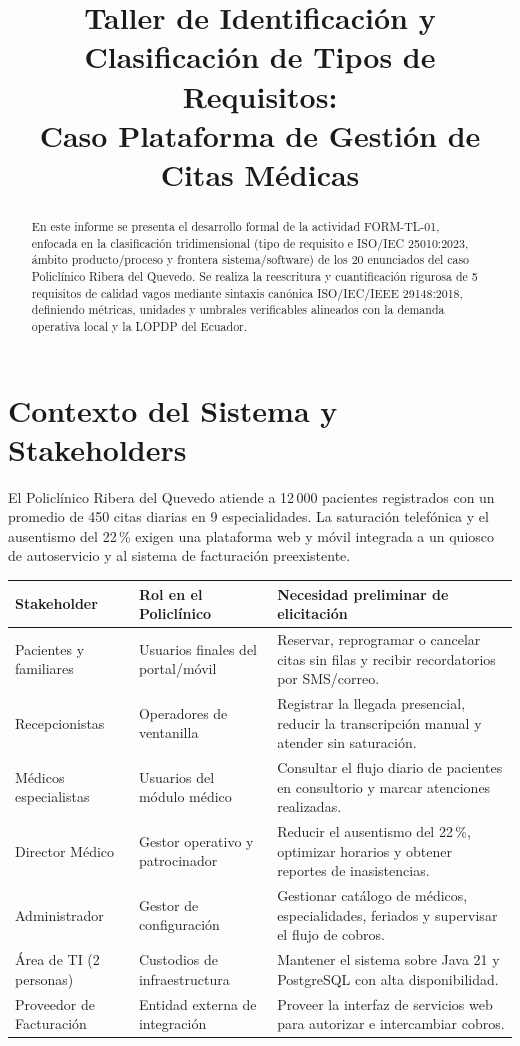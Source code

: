 \documentclass[conference]{IEEEtran}
\title{Taller de Identificaci\'on y Clasificaci\'on de Tipos de Requisitos:\\Caso Plataforma de Gesti\'on de Citas M\'edicas}
\author{
  \IEEEauthorblockN{Jos\'e Ignacio Gilces Carranza}
  \IEEEauthorblockA{Universidad T\'ecnica Estatal de Quevedo (UTEQ) --- Facultad de Ciencias de la Computaci\'on\\
  Ingenier\'ia de Software $\cdot$ Ingenier\'ia de Requisitos (ISR-401) $\cdot$ Actividad Formativa FORM-TL-01}
}
\begin{document}
\onecolumn
\maketitle

\begin{abstract}
En este informe se presenta el desarrollo formal de la actividad FORM-TL-01, enfocada en la clasificaci\'on tridimensional (tipo de requisito e ISO/IEC 25010:2023, \'ambito producto/proceso y frontera sistema/software) de los 20 enunciados del caso Policl\'inico Ribera del Quevedo. Se realiza la reescritura y cuantificaci\'on rigurosa de 5 requisitos de calidad vagos mediante sintaxis can\'onica ISO/IEC/IEEE 29148:2018, definiendo m\'etricas, unidades y umbrales verificables alineados con la demanda operativa local y la LOPDP del Ecuador.
\end{abstract}

\section{Contexto del Sistema y Stakeholders}
El Policl\'inico Ribera del Quevedo atiende a 12\,000 pacientes registrados con un promedio de 450 citas diarias en 9 especialidades. La saturaci\'on telef\'onica y el ausentismo del 22\,\% exigen una plataforma web y m\'ovil integrada a un quiosco de autoservicio y al sistema de facturaci\'on preexistente.

\begin{center}
\footnotesize
\begin{tabularx}{\textwidth}{@{}p{3.2cm}p{3.8cm}>{\raggedright\arraybackslash}X@{}}
\toprule
\textbf{Stakeholder} & \textbf{Rol en el Policl\'inico} & \textbf{Necesidad preliminar de elicitaci\'on}\\
\midrule
Pacientes y familiares & Usuarios finales del portal/m\'ovil & Reservar, reprogramar o cancelar citas sin filas y recibir recordatorios por SMS/correo.\\
Recepcionistas & Operadores de ventanilla & Registrar la llegada presencial, reducir la transcripci\'on manual y atender sin saturaci\'on.\\
M\'edicos especialistas & Usuarios del m\'odulo m\'edico & Consultar el flujo diario de pacientes en consultorio y marcar atenciones realizadas.\\
Director M\'edico & Gestor operativo y patrocinador & Reducir el ausentismo del 22\,\%, optimizar horarios y obtener reportes de inasistencias.\\
Administrador & Gestor de configuraci\'on & Gestionar cat\'alogo de m\'edicos, especialidades, feriados y supervisar el flujo de cobros.\\
\'Area de TI (2 personas) & Custodios de infraestructura & Mantener el sistema sobre Java 21 y PostgreSQL con alta disponibilidad.\\
Proveedor de Facturaci\'on & Entidad externa de integraci\'on & Proveer la interfaz de servicios web para autorizar e intercambiar cobros.\\
\bottomrule
\end{tabularx}
\end{center}
\end{document}
